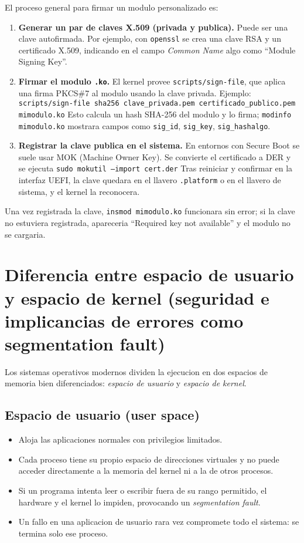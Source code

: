 El proceso general para firmar un modulo personalizado es:

\begin{enumerate}
  \item \textbf{Generar un par de claves X.509 (privada y publica).} Puede ser una clave autofirmada. Por ejemplo, con \texttt{openssl} se crea una clave RSA y un certificado X.509, indicando en el campo \emph{Common Name} algo como ``Module Signing Key''.
  \item \textbf{Firmar el modulo \texttt{.ko}.} El kernel provee \texttt{scripts/sign-file}, que aplica una firma PKCS\#7 al modulo usando la clave privada. Ejemplo:  
  \texttt{scripts/sign-file sha256 clave\_privada.pem certificado\_publico.pem mimodulo.ko}  
  Esto calcula un hash SHA-256 del modulo y lo firma; \texttt{modinfo mimodulo.ko} mostrara campos como \texttt{sig\_id}, \texttt{sig\_key}, \texttt{sig\_hashalgo}.
  \item \textbf{Registrar la clave publica en el sistema.} En entornos con Secure Boot se suele usar MOK (Machine Owner Key). Se convierte el certificado a DER y se ejecuta  
  \texttt{sudo mokutil --import cert.der}  
  Tras reiniciar y confirmar en la interfaz UEFI, la clave quedara en el llavero \texttt{.platform} o en el llavero de sistema, y el kernel la reconocera.
\end{enumerate}

Una vez registrada la clave, \texttt{insmod mimodulo.ko} funcionara sin error; si la clave no estuviera registrada, apareceria ``Required key not available'' y el modulo no se cargaria.

\section{Diferencia entre espacio de usuario y espacio de kernel (seguridad e implicancias de errores como segmentation fault)}

Los sistemas operativos modernos dividen la ejecucion en dos espacios de memoria bien diferenciados: \emph{espacio de usuario} y \emph{espacio de kernel}.

\subsection*{Espacio de usuario (user space)}

\begin{itemize}
  \item Aloja las aplicaciones normales con privilegios limitados.
  \item Cada proceso tiene su propio espacio de direcciones virtuales y no puede acceder directamente a la memoria del kernel ni a la de otros procesos.
  \item Si un programa intenta leer o escribir fuera de su rango permitido, el hardware y el kernel lo impiden, provocando un \textit{segmentation fault}.
  \item Un fallo en una aplicacion de usuario rara vez compromete todo el sistema: se termina solo ese proceso.
\end{itemize}

